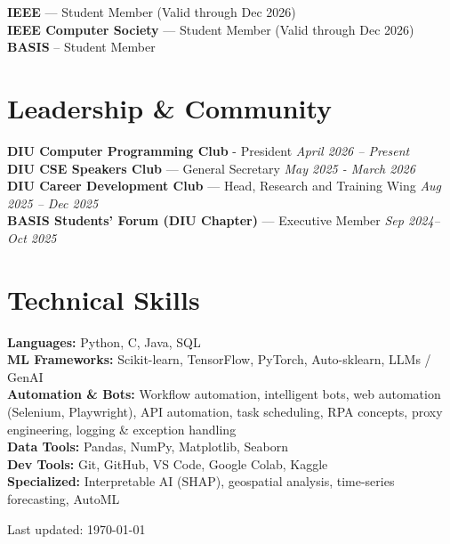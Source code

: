 \documentclass[a4paper,11pt]{article}
\begin{document}
\textbf{IEEE} — Student Member (Valid through Dec 2026) \\
\textbf{IEEE Computer Society} — Student Member (Valid through Dec 2026) \\
\textbf{BASIS} -- Student Member

\section{Leadership \& Community}
\textbf{DIU Computer Programming Club} - President \hfill \textit{April 2026 -- Present} \\
\textbf{DIU CSE Speakers Club} — General Secretary \hfill \textit{May 2025 - March 2026} \\
\textbf{DIU Career Development Club} — Head, Research and Training Wing \hfill \textit{Aug 2025 -- Dec 2025} \\
\textbf{BASIS Students' Forum (DIU Chapter)} — Executive Member \hfill \textit{Sep 2024–Oct 2025}

\section{Technical Skills}

\textbf{Languages:} Python, C, Java, SQL \\
\textbf{ML Frameworks:} Scikit-learn, TensorFlow, PyTorch, Auto-sklearn, LLMs / GenAI \\
\textbf{Automation \& Bots:}  
Workflow automation, intelligent bots, web automation (Selenium, Playwright), API automation, task scheduling, RPA concepts, proxy engineering, logging \& exception handling \\
\textbf{Data Tools:} Pandas, NumPy, Matplotlib, Seaborn \\
\textbf{Dev Tools:} Git, GitHub, VS Code, Google Colab, Kaggle \\
\textbf{Specialized:} Interpretable AI (SHAP), geospatial analysis, time-series forecasting, AutoML

\vfill
\begin{center}
\footnotesize Last updated: \today
\end{center}
\end{document}
